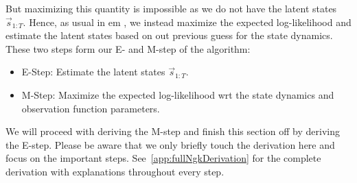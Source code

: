 	But maximizing this quantity is impossible as we do not have the latent states \( \vec{s}_{1:T} \). Hence, as usual in \ac{em} , we instead maximize the expected log-likelihood and estimate the latent states based on out previous guess for the state dynamics. These two steps form our E- and M-step of the \algname algorithm:
	\begin{itemize}
		\item E-Step: Estimate the latent states \( \vec{s}_{1:T} \).
		\item M-Step: Maximize the expected log-likelihood \ac{wrt} the state dynamics and observation function parameters.
	\end{itemize}
	We will proceed with deriving the M-step and finish this section off by deriving the E-step. Please be aware that we only briefly touch the derivation here and focus on the important steps. See~\autoref{app:fullNgkDerivation} for the complete derivation with explanations throughout every step.

